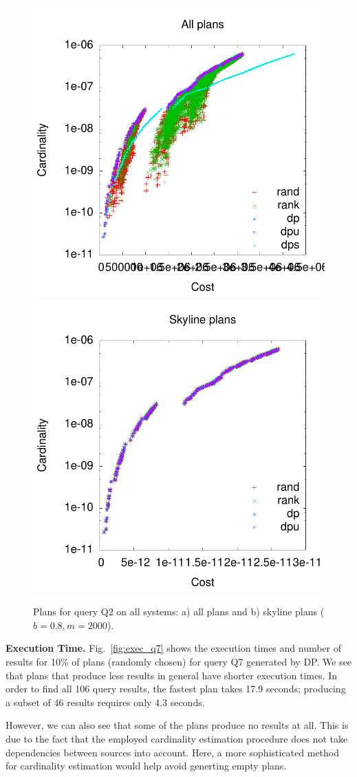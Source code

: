 \begin{figure}[htb]
  \centering
  \includegraphics[width=0.49\linewidth]{figs/plans_q2_all.pdf}
  \includegraphics[width=0.49\linewidth]{figs/plans_q2_sky.pdf}
  \caption{Plans for query Q2 on all systems: a) all plans and b)
    skyline plans ($b=0.8,m=2000$).}
  \label{fig:pareto_q2_skyline}
\end{figure}

\textbf{Execution Time.}  Fig.~\ref{fig:exec_q7} shows the execution
times and number of results for 10\% of plans (randomly chosen) for
query Q7 generated by DP. We see that plans that produce less results
in general have shorter execution times. In order to find all 106
query results, the fastest plan takes 17.9 seconds; producing a subset
of 46 results requires only 4.3 seconds.

However, we can also see that some of the plans produce no results at
all. This is due to the fact that the employed cardinality estimation
procedure does not take dependencies between sources into
account. Here, a more sophisticated method for cardinality estimation
would help avoid generting empty plans.

